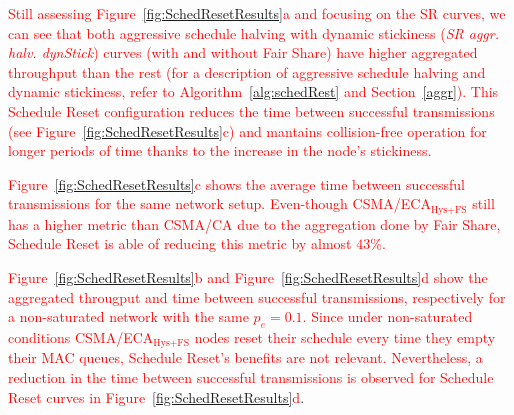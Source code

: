 	\textcolor{red}{Still assessing Figure~\ref{fig:SchedResetResults}a and focusing on the SR curves, we can see that both aggressive schedule halving with dynamic stickiness (\emph{SR aggr. halv. dynStick}) curves (with and without Fair Share) have higher aggregated throughput than the rest (for a description of aggressive schedule halving and dynamic stickiness, refer to Algorithm~\ref{alg:schedRest} and Section~\ref{aggr}). This Schedule Reset configuration reduces the time between successful transmissions (see Figure~\ref{fig:SchedResetResults}c) and mantains collision-free operation for longer periods of time thanks to the increase in the node's stickiness.}
	
	\textcolor{red}{Figure~\ref{fig:SchedResetResults}c shows the average time between successful transmissions for the same network setup. Even-though CSMA/ECA$_{\text{Hys+FS}}$ still has a higher metric than CSMA/CA due to the aggregation done by Fair Share, Schedule Reset is able of reducing this metric by almost $43\%$.}
	
	\textcolor{red}{Figure~\ref{fig:SchedResetResults}b and Figure~\ref{fig:SchedResetResults}d show the aggregated througput and time between successful transmissions, respectively for a non-saturated network with the same $p_e=0.1$. Since under non-saturated conditions CSMA/ECA$_{\text{Hys+FS}}$ nodes reset their schedule every time they empty their MAC queues, Schedule Reset's benefits are not relevant. Nevertheless, a reduction in the time between successful transmissions is observed for Schedule Reset curves in Figure~\ref{fig:SchedResetResults}d}.
	
	
	
%	
